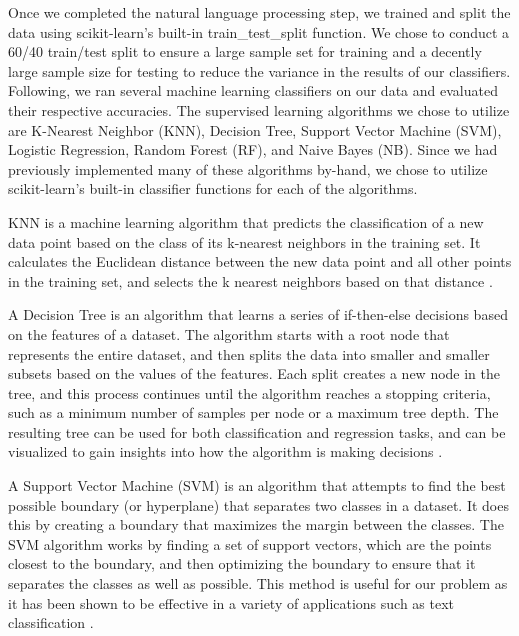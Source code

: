 \documentclass{article}
\begin{document}
Once we completed the natural language processing step, we trained and split the data using scikit-learn’s built-in train\_test\_split function. We chose to conduct a 60/40 train/test split to ensure a large sample set for training and a decently large sample size for testing to reduce the variance in the results of our classifiers. Following, we ran several machine learning classifiers on our data and evaluated their respective accuracies. The supervised learning algorithms we chose to utilize are K-Nearest Neighbor (KNN), Decision Tree, Support Vector Machine (SVM), Logistic Regression, Random Forest (RF), and Naive Bayes (NB). Since we had previously implemented many of these algorithms by-hand, we chose to utilize scikit-learn’s built-in classifier functions for each of the algorithms.

KNN is a machine learning algorithm that predicts the classification of a new data point based on the class of its k-nearest neighbors in the training set. It calculates the Euclidean distance between the new data point and all other points in the training set, and selects the k nearest neighbors based on that distance \cite{kneighbors23, supervisedlearning}.

A Decision Tree is an algorithm that learns a series of if-then-else decisions based on the features of a dataset. The algorithm starts with a root node that represents the entire dataset, and then splits the data into smaller and smaller subsets based on the values of the features. Each split creates a new node in the tree, and this process continues until the algorithm reaches a stopping criteria, such as a minimum number of samples per node or a maximum tree depth. The resulting tree can be used for both classification and regression tasks, and can be visualized to gain insights into how the algorithm is making decisions \cite{decisiontree23, supervisedlearning}.

A Support Vector Machine (SVM) is an algorithm that attempts to find the best possible boundary (or hyperplane) that separates two classes in a dataset. It does this by creating a boundary that maximizes the margin between the classes. The SVM algorithm works by finding a set of support vectors, which are the points closest to the boundary, and then optimizing the boundary to ensure that it separates the classes as well as possible. This method is useful for our problem as it has been shown to be effective in a variety of applications such as text classification \cite{sgdclassifier23, supervisedlearning}.
\end{document}
